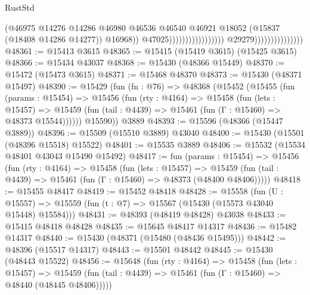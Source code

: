 \begin{lexlean}{RustStd}
\begin{coremodule}
{\begin{coremodule}
{{{{{{{{{{{{{{{{{{{{{{{{{{{{{{{{{{{{{{{{{{{{{{{{{{{{{{{{{{{{                                                                      (@46975
                                                                        @14276
                                                                        @14286
                                                                        @46980
                                                                        @46536
                                                                        @46540
                                                                        @46921
                                                                        @18052
                                                                        (@15837
                                                                          (@18408 @14286 @14277))
                                                                        @16968))
                                                                    @47025)))))))))))))))))
                                  @29279)))))))))))))))
@48361 := @15413 @3615
@48365 := @15415 (@15419 @3615) (@15425 @3615)
@48366 := @15434 @43037
@48368 := @15430 (@48366 @15449)
@48370 := @15472 (@15473 @3615)
@48371 := @15468 @48370
@48373 := @15430 (@48371 @15497)
@48390 := @15429
    (fun (fn : @76) =>
    @48368
      (@15452
        (@15455
          (fun (params : @15454) =>
          @15456
            (fun (rty : @4164) =>
            @15458
              (fun (lets : @15457) =>
              @15459 (fun (tail : @4439) => @15461 (fun (Γ : @15460) => @48373 @15544))))))
        @15590))
    @3889
@48393 := @15596 (@48366 (@15447 @3889))
@48396 := @15509 (@15510 @3889) @43040
@48400 := @15430 (@15501 (@48396 @15518) @15522)
@48401 := @15535 @3889
@48406 := @15532 (@15534 @48401 @43043 @15490 @15492)
@48417 := fun (params : @15454) =>
  @15456
    (fun (rty : @4164) =>
    @15458
      (fun (lets : @15457) =>
      @15459 (fun (tail : @4439) => @15461 (fun (Γ : @15460) => @48373 (@48400 @48406)))))
@48418 := @15455 @48417
@48419 := @15452 @48418
@48428 := @15558
    (fun (U : @15557) => @15559 (fun (t : @7) => @15567 (@15430 (@15573 @43040 @15448) @15584)))
@48431 := @48393 (@48419 @48428) @43038
@48433 := @15415 @48418 @48428
@48435 := @15645 @48417 @14317
@48436 := @15482 @14317
@48440 := @15430 (@48371 (@15480 (@48436 @15495)))
@48442 := @48396 (@15517 @14317)
@48443 := @15501 @48442
@48445 := @15430 (@48443 @15522)
@48456 := @15648
    (fun (rty : @4164) =>
    @15458
      (fun (lets : @15457) =>
      @15459 (fun (tail : @4439) => @15461 (fun (Γ : @15460) => @48440 (@48445 @48406)))))
}}}}}}}}}}}}}}}}}}}}}}}}}}}}}}}}}}}}}}}}}}}}}}}}}}}}}}}}}}}}
\end{coremodule}}
\end{coremodule}
\end{lexlean}
